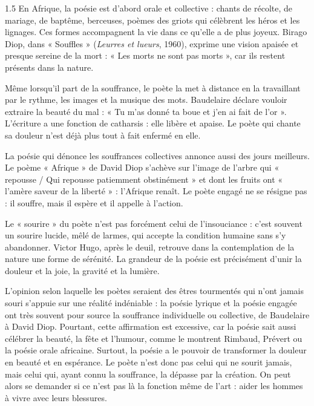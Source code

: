 \documentclass[12pt]{article}
\begin{document}
\begin{spacing}{1.5}
En Afrique, la poésie est d'abord orale et collective : chants de récolte, de mariage, de baptême, berceuses, poèmes des griots qui célèbrent les héros et les lignages. Ces formes accompagnent la vie dans ce qu'elle a de plus joyeux. Birago Diop, dans « Souffles » (\emph{Leurres et lueurs}, 1960), exprime une vision apaisée et presque sereine de la mort : « Les morts ne sont pas morts », car ils restent présents dans la nature.



Même lorsqu'il part de la souffrance, le poète la met à distance en la travaillant par le rythme, les images et la musique des mots. Baudelaire déclare vouloir extraire la beauté du mal : « Tu m'as donné ta boue et j'en ai fait de l'or ». L'écriture a une fonction de catharsis : elle libère et apaise. Le poète qui chante sa douleur n'est déjà plus tout à fait enfermé en elle.

La poésie qui dénonce les souffrances collectives annonce aussi des jours meilleurs. Le poème « Afrique » de David Diop s'achève sur l'image de l'arbre qui « repousse / Qui repousse patiemment obstinément » et dont les fruits ont « l'amère saveur de la liberté » : l'Afrique renaît. Le poète engagé ne se résigne pas : il souffre, mais il espère et il appelle à l'action.

Le « sourire » du poète n'est pas forcément celui de l'insouciance : c'est souvent un sourire lucide, mêlé de larmes, qui accepte la condition humaine sans s'y abandonner. Victor Hugo, après le deuil, retrouve dans la contemplation de la nature une forme de sérénité. La grandeur de la poésie est précisément d'unir la douleur et la joie, la gravité et la lumière.


L'opinion selon laquelle les poètes seraient des êtres tourmentés qui n'ont jamais souri s'appuie sur une réalité indéniable : la poésie lyrique et la poésie engagée ont très souvent pour source la souffrance individuelle ou collective, de Baudelaire à David Diop. Pourtant, cette affirmation est excessive, car la poésie sait aussi célébrer la beauté, la fête et l'humour, comme le montrent Rimbaud, Prévert ou la poésie orale africaine. Surtout, la poésie a le pouvoir de transformer la douleur en beauté et en espérance. Le poète n'est donc pas celui qui ne sourit jamais, mais celui qui, ayant connu la souffrance, la dépasse par la création. On peut alors se demander si ce n'est pas là la fonction même de l'art : aider les hommes à vivre avec leurs blessures.

\end{spacing}
\end{document}
